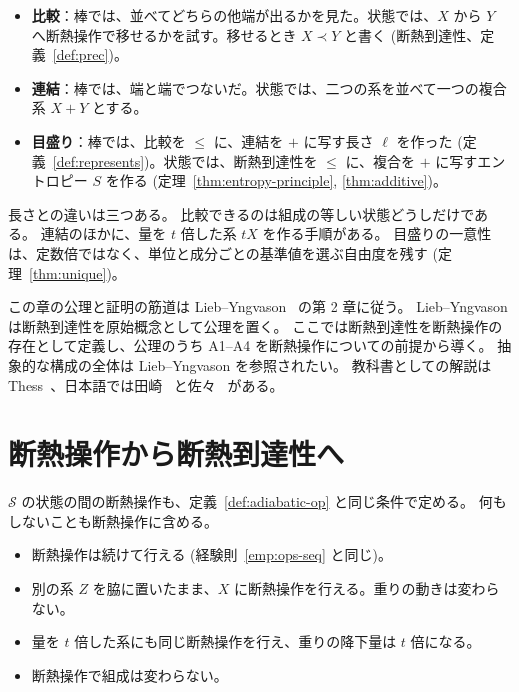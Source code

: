 \begin{itemize}
  \item \textbf{比較}：棒では、並べてどちらの他端が出るかを見た。状態では、$X$ から $Y$ へ断熱操作で移せるかを試す。移せるとき $X \prec Y$ と書く (断熱到達性、定義~\ref{def:prec})。
  \item \textbf{連結}：棒では、端と端でつないだ。状態では、二つの系を並べて一つの複合系 $X + Y$ とする。
  \item \textbf{目盛り}：棒では、比較を $\le$ に、連結を $+$ に写す長さ $\ell$ を作った (定義~\ref{def:represents})。状態では、断熱到達性を $\le$ に、複合を $+$ に写すエントロピー $S$ を作る (定理~\ref{thm:entropy-principle}, \ref{thm:additive})。
\end{itemize}

長さとの違いは三つある。
比較できるのは組成の等しい状態どうしだけである。
連結のほかに、量を $t$ 倍した系 $tX$ を作る手順がある。
目盛りの一意性は、定数倍ではなく、単位と成分ごとの基準値を選ぶ自由度を残す (定理~\ref{thm:unique})。

この章の公理と証明の筋道は Lieb--Yngvason~\cite{LY99} の第 2 章に従う。
Lieb--Yngvason は断熱到達性を原始概念として公理を置く。
ここでは断熱到達性を断熱操作の存在として定義し、公理のうち A1--A4 を断熱操作についての前提から導く。
抽象的な構成の全体は Lieb--Yngvason を参照されたい。
教科書としての解説は Thess~\cite{Thess2011}、日本語では田崎~\cite{Tasaki2000} と佐々~\cite{Sasa2000} がある。

\section{断熱操作から断熱到達性へ}
\label{sec:accessibility-axioms}

\begin{definition}[複合系の断熱操作]
  \label{def:composite-ops}
  \leanok
  $\mathcal{S}$ の状態の間の断熱操作も、定義~\ref{def:adiabatic-op} と同じ条件で定める。
  何もしないことも断熱操作に含める。
\end{definition}

\begin{empirical}[複合系の断熱操作の法則]
  \label{emp:composite-ops}
  \leanok
  \begin{itemize}
    \item 断熱操作は続けて行える (経験則~\ref{emp:ops-seq} と同じ)。
    \item 別の系 $Z$ を脇に置いたまま、$X$ に断熱操作を行える。重りの動きは変わらない。
    \item 量を $t$ 倍した系にも同じ断熱操作を行え、重りの降下量は $t$ 倍になる。
    \item 断熱操作で組成は変わらない。
  \end{itemize}
\end{empirical}

